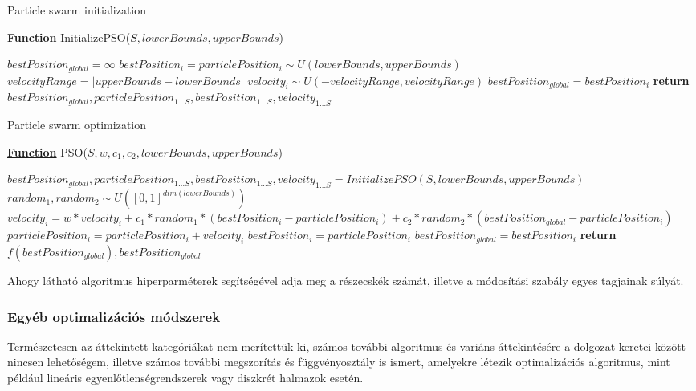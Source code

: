 \begin{algorithm}[H]
\caption{Particle swarm initialization}
\label{alg:pso_init} 
\textbf{\underline{Function}} InitializePSO($S, lowerBounds, upperBounds$)
\begin{algorithmic}[1] %
\STATE $bestPosition_{global} = \infty$
	\STATE $bestPosition_i = particlePosition_i \sim U(lowerBounds, upperBounds)$
	\STATE $velocityRange = |upperBounds-lowerBounds|$
	\STATE $velocity_i \sim U(-velocityRange, velocityRange)$
		\STATE $bestPosition_{global} = bestPosition_i$
	\ENDIF
\ENDFOR
\STATE \textbf{return} $bestPosition_{global}, particlePosition_{1 \ldots S}, bestPosition_{1 \ldots S}, velocity_{1 \ldots S}$
\end{algorithmic}
\end{algorithm}

\begin{algorithm}[H]
\caption{Particle swarm optimization}
\label{alg:pso} 
\textbf{\underline{Function}} PSO($S, w, c_1, c_2, lowerBounds, upperBounds$)
\begin{algorithmic}[1] %
\STATE $bestPosition_{global}, particlePosition_{1 \ldots S}, bestPosition_{1 \ldots S}, velocity_{1 \ldots S} = InitializePSO(S, lowerBounds, upperBounds)$
		\STATE $random_1, random_2 \sim U([0,1]^{dim(lowerBounds)})$
		\STATE $velocity_i = w*velocity_i + c_1*random_1*(bestPosition_i-particlePosition_i) + c_2*random_2*(bestPosition_{global}-particlePosition_i)$
		\STATE $particlePosition_i = particlePosition_i + velocity_i$ 
			\STATE $bestPosition_i = particlePosition_i$
				\STATE $bestPosition_{global} = bestPosition_i$
			\ENDIF
		\ENDIF
	\ENDFOR
\ENDWHILE
\STATE \textbf{return} $f(bestPosition_{global}), bestPosition_{global}$
\end{algorithmic}
\end{algorithm}


Ahogy látható algoritmus hiperparméterek segítségével adja meg a részecskék számát, illetve a módosítási szabály egyes tagjainak súlyát. %

\subsubsection{Egyéb optimalizációs módszerek}
Természetesen az áttekintett kategóriákat nem merítettük ki, számos további algoritmus és variáns áttekintésére a dolgozat keretei között nincsen lehetőségem, illetve számos további megszorítás és függvényosztály is ismert, amelyekre létezik optimalizációs algoritmus, mint például lineáris egyenlőtlenségrendszerek vagy diszkrét halmazok esetén.

